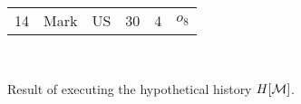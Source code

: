 \begin{figure}[t]
\begin{minipage}{1\linewidth}
{\begin{minipage}{1.5\columnwidth}
\begin{tabular}{|c|c|c|c|c|l}
                                                                                                                                                                                                                                          14 & Mark             & US              & 30            & 4                      & $o_8$                                                           \\ \cline{1-5}
        \end{tabular}
      \end{minipage}
    }                                                                                                                                                     \\[-3mm]
    \caption{Result of executing the hypothetical history $H[\mathcal{M}]$.}
    \label{fig:whatif-example-instance}
  \end{minipage}
\end{figure}

